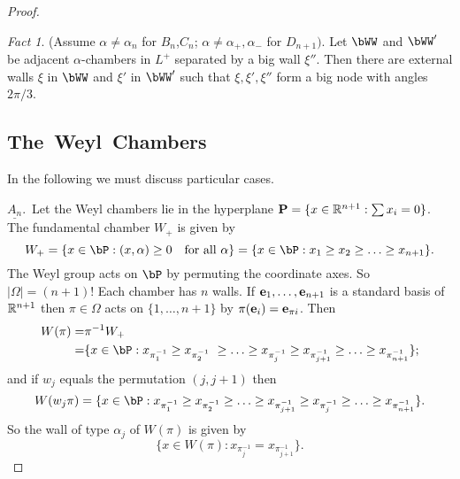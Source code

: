 \documentclass{memo-l}
\theoremstyle{definition}
\theoremstyle{remark}
\newtheorem{fact}{Fact}
\numberwithin{section}{chapter}
\numberwithin{equation}{chapter}
\begin{document}
\begin{proof}
\begin{fact} %
(Assume $\alpha\ne\alpha_n$ for $B_n$,$C_n$;
${\alpha}\ne {\alpha}_{+},{\alpha}_{-}$ for
$D_{n+1})$.  Let $\bWW$ and $\bWW'$ be adjacent ${\alpha}$-chambers
in $L^{+}$ separated by a big wall ${\xi''}$.  Then there are external walls
${\xi}$ in $\bWW$ and ${\xi}'$ in $\bWW'$ such that
${\xi},{\xi}',{\xi''}$ form a big node with angles $2{\pi}/3$.
\end{fact}

\medskip
\medskip

\subsection*{The\ Weyl\ Chambers}

   In the following we must discuss particular cases.

\noindent
$\underline{A_n}.$\  Let the Weyl chambers lie in the hyperplane
${\bold	P} = \{ x  \in  {\Bbb R}^{n+1}: \sum x_{i} = 0\}$.
The fundamental chamber	$W_{+}$ is given by
$$
W_{+} = \{ x \in \bP: (x,{\alpha}) \ge 0\quad  {\text{for\ all}}\
{\alpha}\} = \{ x  \in  \bP: x_{1} \ge x_{2} \ge \ldots \ge x_{n+1}\}.
$$
The Weyl group acts on $\bP$ by permuting the coordinate axes.  So
$\vert {\Omega}\vert = (n+1)$!  Each chamber has $n$ walls.  If ${\bold
e_{1}},\ldots ,{\bold e_{n+1}}$ is a standard basis of ${\Bbb R}^{n+1}$
then ${\pi}  \in  {\Omega}$ acts on $\{1,\ldots ,n+1\}$ by
${\pi}({\bold e_{i}}) = {\bold e_{{\pi}i}}$.
Then
$$\aligned
W({\pi}) =& {\pi}^{-1}W_{+} \\ =&
\{x  \in  \bP: x_{\pi_1^{-1}} \ge x_{\pi_2^{-1}}\ \ge \ldots \ge
x_{\pi_j^{-1}} \ge x_{\pi_{j+1}^{-1}}  \ge \ldots \ge
x_{\pi_{n+1}^{-1}}\};\endaligned
$$
and if $w_{j}$ equals the permutation $(j,j+1)$ then
$$
W(w_j{\pi}) = \{ x \in \bP: x_{\pi_1^{-1}} \ge
x_{\pi_2^{-1}} \ge \ldots \ge x_{\pi_{j+1}^{-1}} \ge x_{\pi_j^{-1}}
\ge \ldots \ge x_{\pi_{n+1}^{-1}} \}.
$$
So the wall of type ${\alpha}_{j}$ of $W({\pi})$ is given by
$$
\{x  \in  W({\pi}): x_{\pi_j^{-1}} = x_{\pi_{j+1}^{-1}}\}.
$$



\end{proof}
\end{document}
